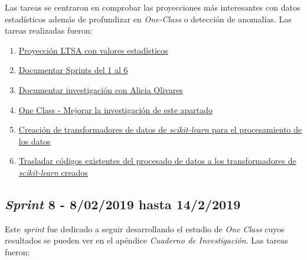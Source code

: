 Las tareas se centraron en comprobar las proyecciones más interesantes con datos estadísticos además de profundizar en \textit{One-Class} o detección de anomalías. Las tareas realizadas fueron:
\begin{enumerate}\addtocounter{enumi}{21}
	\item \href{https://github.com/joselucross/TFG-SmartBeds/issues/22}{Proyección LTSA con valores estadísticos}~\cite{zhang2004principal}
	\item 
	\href{https://github.com/joselucross/TFG-SmartBeds/issues/23}{Documentar Sprints del 1 al 6}
	\item
	\href{https://github.com/joselucross/TFG-SmartBeds/issues/24}{Documentar investigación con Alicia Olivares}
	\item
	\href{https://github.com/joselucross/TFG-SmartBeds/issues/25}{One Class - Mejorar la investigación de este apartado}
	\item
	\href{https://github.com/joselucross/TFG-SmartBeds/issues/26}{Creación de transformadores de datos de \textit{scikit-learn} para el procesamiento de los datos}
	\item
	\href{https://github.com/joselucross/TFG-SmartBeds/issues/27}{Trasladar códigos existentes del procesado de datos a los transformadores de \textit{scikit-learn} creados}
\end{enumerate}

\subsection{\textit{Sprint} 8 - 8/02/2019 hasta 14/2/2019}
Este \textit{sprint} fue dedicado a seguir desarrollando el estudio de \textit{One Class} cuyos resultados se pueden ver en el apéndice \textit{Cuaderno de Investigación}. Las tareas fueron:

